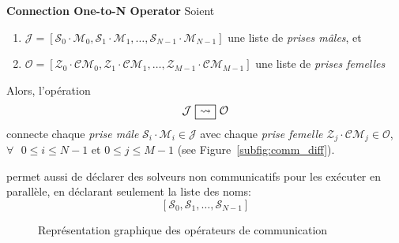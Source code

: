 \begin{lemma}\label{op_conn:1ton}
{\bf Connection One-to-N Operator} Soient 
\begin{enumerate} 
\item $\mathcal{J} = \left[\mathcal{S}_0\cdot \mathcal{M}_0, \mathcal{S}_1\cdot \mathcal{M}_1,\dots, \mathcal{S}_{N-1}\cdot \mathcal{M}_{N-1}\right]$ une liste de  {\it prises mâles}, et
\item $\mathcal{O} = \left[\mathcal{Z}_0\cdot \mathcal{CM}_0, \mathcal{Z}_1\cdot \mathcal{CM}_1,\dots, \mathcal{Z}_{M-1}\cdot \mathcal{CM}_{M-1}\right]$ une liste de {\it prises femelles}
\end{enumerate} Alors, l'opération
\[
\mathcal{J} \onetonsep \mathcal{O}
\]
connecte chaque {\it prise mâle} $\mathcal{S}_i\cdot \mathcal{M}_i \in \mathcal{J}$ avec chaque {\it prise femelle} $\mathcal{Z}_j\cdot \mathcal{CM}_j \in \mathcal{O}$, $\forall\textbf{ }0 \leq i \leq N-1$ et $0 \leq j \leq M-1$ (see Figure~\ref{subfig:comm_diff}).
\end{lemma}


\posl{} permet aussi de déclarer des solveurs non communicatifs pour les exécuter en parallèle, en déclarant seulement la liste des noms:
\[
\left[\mathcal{S}_0, \mathcal{S}_1, \dots, \mathcal{S}_{N-1}\right]
\]

\begin{figure}[t]
\centering
{}
\hspace{0.05\textwidth}%
\caption[]{Représentation graphique des opérateurs de communication}
\label{fig:comm}
\end{figure}